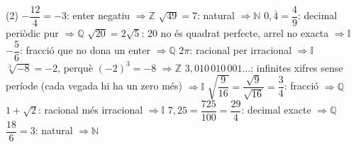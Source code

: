 \documentclass[11pt,a4paper]{article}
\newcommand{\res}[1]{\boxed{#1}}
\begin{document}
\begin{tasks}(2)
  \task $-\dfrac{12}{4}=-3$: enter negatiu $\Rightarrow\res{\mathbb{Z}}$
  \task $\sqrt{49}=7$: natural $\Rightarrow\res{\mathbb{N}}$
  \task $0,\overline{4}=\dfrac49$: decimal periòdic pur $\Rightarrow\res{\mathbb{Q}}$
  \task $\sqrt{20}=2\sqrt5$: 20 no és quadrat perfecte, arrel no exacta $\Rightarrow\res{\mathbb{I}}$
  \task $-\dfrac56$: fracció que no dona un enter $\Rightarrow\res{\mathbb{Q}}$
  \task $2\pi$: racional per irracional $\Rightarrow\res{\mathbb{I}}$
  \task $\sqrt[3]{-8}=-2$, perquè $(-2)^{3}=-8$ $\Rightarrow\res{\mathbb{Z}}$
  \task $3,010\,010\,001\ldots$: infinites xifres sense període (cada vegada hi ha un zero més) $\Rightarrow\res{\mathbb{I}}$
  \task $\sqrt{\dfrac{9}{16}}=\dfrac{\sqrt9}{\sqrt{16}}=\dfrac34$: fracció $\Rightarrow\res{\mathbb{Q}}$
  \task $1+\sqrt2$: racional més irracional $\Rightarrow\res{\mathbb{I}}$
  \task $7,25=\dfrac{725}{100}=\dfrac{29}{4}$: decimal exacte $\Rightarrow\res{\mathbb{Q}}$
  \task $\dfrac{18}{6}=3$: natural $\Rightarrow\res{\mathbb{N}}$
\end{tasks}
\end{document}
